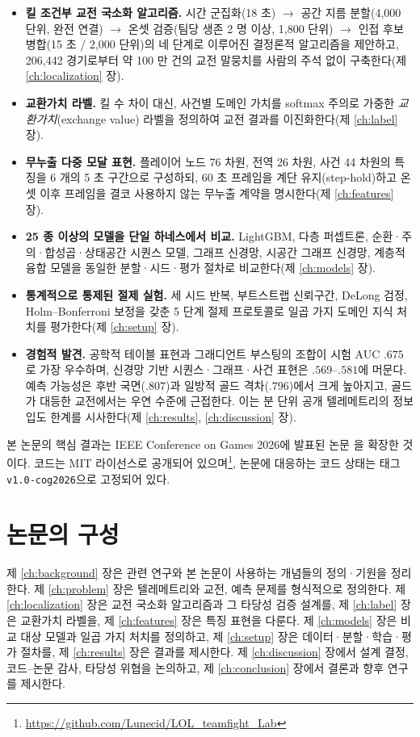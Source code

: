 \begin{itemize}[leftmargin=1.5em]
  \item \textbf{킬 조건부 교전 국소화 알고리즘.} 시간 군집화(18 초) $\to$ 공간 지름 분할(4{,}000 단위, 완전 연결) $\to$ 온셋 검증(팀당 생존 2 명 이상, 1{,}800 단위) $\to$ 인접 후보 병합(15 초 / 2{,}000 단위)의 네 단계로 이루어진 결정론적 알고리즘을 제안하고, 206{,}442 경기로부터 약 100 만 건의 교전 말뭉치를 사람의 주석 없이 구축한다(제 \ref{ch:localization} 장).
  \item \textbf{교환가치 라벨.} 킬 수 차이 대신, 사건별 도메인 가치를 softmax 주의로 가중한 \emph{교환가치}(exchange value) 라벨을 정의하여 교전 결과를 이진화한다(제 \ref{ch:label} 장).
  \item \textbf{무누출 다중 모달 표현.} 플레이어 노드 76 차원, 전역 26 차원, 사건 44 차원의 특징을 6 개의 5 초 구간으로 구성하되, 60 초 프레임을 계단 유지(step-hold)하고 온셋 이후 프레임을 결코 사용하지 않는 무누출 계약을 명시한다(제 \ref{ch:features} 장).
  \item \textbf{25 종 이상의 모델을 단일 하네스에서 비교.} LightGBM, 다층 퍼셉트론, 순환·주의·합성곱·상태공간 시퀀스 모델, 그래프 신경망, 시공간 그래프 신경망, 계층적 융합 모델을 동일한 분할·시드·평가 절차로 비교한다(제 \ref{ch:models} 장).
  \item \textbf{통계적으로 통제된 절제 실험.} 세 시드 반복, 부트스트랩 신뢰구간, DeLong 검정, Holm--Bonferroni 보정을 갖춘 5 단계 절제 프로토콜로 일곱 가지 도메인 지식 처치를 평가한다(제 \ref{ch:setup} 장).
  \item \textbf{경험적 발견.} 공학적 테이블 표현과 그래디언트 부스팅의 조합이 시험 AUC $.675$로 가장 우수하며, 신경망 기반 시퀀스·그래프·사건 표현은 $.569$--$.581$에 머문다. 예측 가능성은 후반 국면($.807$)과 일방적 골드 격차($.796$)에서 크게 높아지고, 골드가 대등한 교전에서는 우연 수준에 근접한다. 이는 분 단위 공개 텔레메트리의 정보 입도 한계를 시사한다(제 \ref{ch:results}, \ref{ch:discussion} 장).
\end{itemize}

본 논문의 핵심 결과는 IEEE Conference on Games 2026에 발표된 논문 \cite{baek2026killconditioned}을 확장한 것이다. 코드는 MIT 라이선스로 공개되어 있으며\footnote{\url{https://github.com/Lunecid/LOL_teamfight_Lab}}, 논문에 대응하는 코드 상태는 태그 \texttt{v1.0-cog2026}으로 고정되어 있다.

\section{논문의 구성}
\label{sec:intro-outline}

제 \ref{ch:background} 장은 관련 연구와 본 논문이 사용하는 개념들의 정의·기원을 정리한다. 제 \ref{ch:problem} 장은 텔레메트리와 교전, 예측 문제를 형식적으로 정의한다. 제 \ref{ch:localization} 장은 교전 국소화 알고리즘과 그 타당성 검증 설계를, 제 \ref{ch:label} 장은 교환가치 라벨을, 제 \ref{ch:features} 장은 특징 표현을 다룬다. 제 \ref{ch:models} 장은 비교 대상 모델과 일곱 가지 처치를 정의하고, 제 \ref{ch:setup} 장은 데이터·분할·학습·평가 절차를, 제 \ref{ch:results} 장은 결과를 제시한다. 제 \ref{ch:discussion} 장에서 설계 결정, 코드--논문 감사, 타당성 위협을 논의하고, 제 \ref{ch:conclusion} 장에서 결론과 향후 연구를 제시한다.
